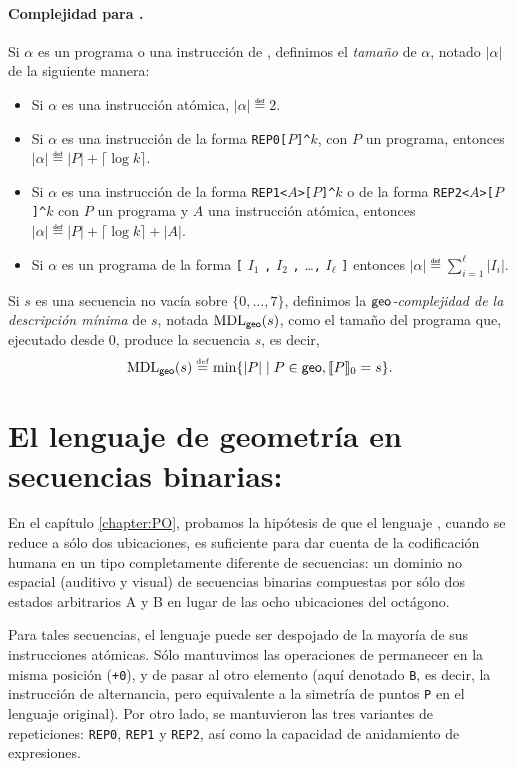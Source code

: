 \paragraph{Complejidad para \gramgeo.} 
Si $\alpha$ es un programa o una instrucción de \gramgeo, definimos el {\em tamaño} de $\alpha$, notado $|\alpha|$ de la siguiente manera:
%
\begin{itemize}
\item Si $\alpha$ es una instrucción atómica, $|\alpha|\eqdef 2$.

\item Si $\alpha$ es una instrucción de la forma 
\verb#REP0[#$P$\verb#]^#$k$, con $P$ un programa, 
entonces $|\alpha|\eqdef |P|+\lceil \log k\rceil$.

\item Si $\alpha$ es una instrucción de la forma 
\verb#REP1<#$A$\verb#>[#$P$\verb#]^#$k$ o de la forma 
\verb#REP2<#$A$\verb#>[#$P$\verb#]^#$k$ 
con $P$ un programa y $A$ una instrucción atómica, 
entonces $|\alpha|\eqdef |P|+\lceil \log k\rceil+|A|$.

\item Si $\alpha$ es un programa de la forma
\verb#[# $I_1$ \verb#,# $I_2$ \verb#,# \dots \verb#,# $I_\ell$ \verb#]#
entonces $|\alpha|\eqdef \sum_{i=1}^\ell|I_i|$.
\end{itemize}
%
Si $s$ es una secuencia no vacía sobre $\{0,\dots,7\}$, definimos la {\em ${\sf geo}$-complejidad de la descripción mínima} de $s$, notada ${\rm MDL}_{{\sf geo}}(s)$, como el tamaño del programa que, ejecutado desde 0, produce la secuencia $s$, es decir,
$$
{\rm MDL}_{{\sf geo}}(s)\stackrel{\scriptscriptstyle \mathrm{def}}{=}\min\{|P|\mid P\in{\sf geo},\llbracket P\rrbracket_0=s\}.
$$


\section*{El lenguaje de geometría en secuencias binarias: \grambin}

En el capítulo \ref{chapter:PO}, probamos la hipótesis de que el lenguaje \gramgeo, cuando se reduce a sólo dos ubicaciones, es suficiente para dar cuenta de la codificación humana en un tipo completamente diferente de secuencias: un dominio no espacial (auditivo y visual) de secuencias binarias compuestas por sólo dos estados arbitrarios A y B en lugar de las ocho ubicaciones del octágono. 

Para tales secuencias, el lenguaje puede ser despojado de la mayoría de sus instrucciones atómicas. Sólo mantuvimos las operaciones de permanecer en la misma posición (\verb#+0#), y de pasar al otro elemento (aquí denotado \verb#B#, es decir, la instrucción de alternancia, pero equivalente a la simetría de puntos \verb#P# en el lenguaje original). Por otro lado, se mantuvieron las tres variantes de repeticiones: \verb#REP0#, \verb#REP1# y \verb#REP2#, así como la capacidad de anidamiento de expresiones. 

